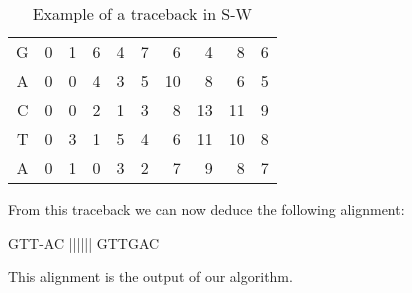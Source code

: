 \begin{enumerate}
\begin{table}[H]
\begin{tabular}{rrrrrrrrrr}
			\multicolumn{1}{r|}{G} & \multicolumn{1}{r|}{0} & \multicolumn{1}{r|}{1}                         & \multicolumn{1}{r|}{6}                         & \multicolumn{1}{r|}{4}                         & \multicolumn{1}{r|}{\cellcolor[HTML]{DAE8FC}7} & \multicolumn{1}{r|}{6}                          & \multicolumn{1}{r|}{4}                          & \multicolumn{1}{r|}{8}  & \multicolumn{1}{r|}{6} \\ \cline{2-10} 
			\multicolumn{1}{r|}{A} & \multicolumn{1}{r|}{0} & \multicolumn{1}{r|}{0}                         & \multicolumn{1}{r|}{4}                         & \multicolumn{1}{r|}{3}                         & \multicolumn{1}{r|}{5}                         & \multicolumn{1}{r|}{\cellcolor[HTML]{DAE8FC}10} & \multicolumn{1}{r|}{8}                          & \multicolumn{1}{r|}{6}  & \multicolumn{1}{r|}{5} \\ \cline{2-10} 
			\multicolumn{1}{r|}{C} & \multicolumn{1}{r|}{0} & \multicolumn{1}{r|}{0}                         & \multicolumn{1}{r|}{2}                         & \multicolumn{1}{r|}{1}                         & \multicolumn{1}{r|}{3}                         & \multicolumn{1}{r|}{8}                          & \multicolumn{1}{r|}{\cellcolor[HTML]{34CDF9}13} & \multicolumn{1}{r|}{11} & \multicolumn{1}{r|}{9} \\ \cline{2-10} 
			\multicolumn{1}{r|}{T} & \multicolumn{1}{r|}{0} & \multicolumn{1}{r|}{3}                         & \multicolumn{1}{r|}{1}                         & \multicolumn{1}{r|}{5}                         & \multicolumn{1}{r|}{4}                         & \multicolumn{1}{r|}{6}                          & \multicolumn{1}{r|}{11}                         & \multicolumn{1}{r|}{10} & \multicolumn{1}{r|}{8} \\ \cline{2-10} 
			\multicolumn{1}{r|}{A} & \multicolumn{1}{r|}{0} & \multicolumn{1}{r|}{1}                         & \multicolumn{1}{r|}{0}                         & \multicolumn{1}{r|}{3}                         & \multicolumn{1}{r|}{2}                         & \multicolumn{1}{r|}{7}                          & \multicolumn{1}{r|}{9}                          & \multicolumn{1}{r|}{8}  & \multicolumn{1}{r|}{7} \\ \cline{2-10} 
		\end{tabular}
		\caption{\centering Example of a traceback in S-W}
	\end{table}
	
	From this traceback we can now deduce the following alignment:
	
	\begin{lcverbatim}
		GTT-AC
		||||||
		GTTGAC
	\end{lcverbatim}
	
	This alignment is the output of our algorithm.
	
\end{enumerate}

